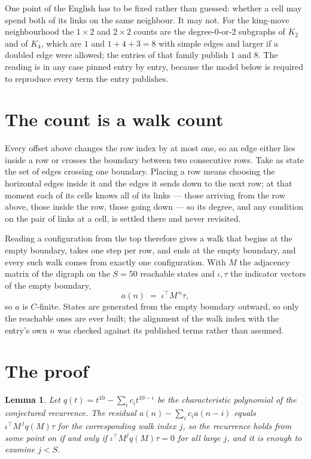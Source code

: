 \documentclass[11pt,a4paper]{article}
\theoremstyle{plain}
\newtheorem{lemma}[theorem]{Lemma}
\theoremstyle{definition}
\begin{document}
One point of the English has to be fixed rather than guessed: whether a cell may spend both of
its links on the same neighbour. It may not. For the king-move neighbourhood the $1\times2$
and $2\times2$ counts are the degree-$0$-or-$2$ subgraphs of $K_2$ and of $K_4$, which are $1$
and $1+4+3=8$ with simple edges and larger if a doubled edge were allowed; the entries of that
family publish $1$ and $8$. The reading is in any case pinned entry by entry, because the
model below is required to reproduce every term the entry publishes.


\section{The count is a walk count}

Every offset above changes the row index by at most one, so an edge either lies inside a row
or crosses the boundary between two consecutive rows. Take as state the set of edges crossing
one boundary. Placing a row means choosing the horizontal edges inside it and the edges it
sends down to the next row; at that moment each of its cells knows all of its links --- those
arriving from the row above, those inside the row, those going down --- so its degree, and any
condition on the pair of links at a cell, is settled there and never revisited.

Reading a configuration from the top therefore gives a walk that begins at the empty boundary,
takes one step per row, and ends at the empty boundary, and every such walk comes from exactly
one configuration. With $M$ the adjacency matrix of the digraph on the $S=50$ reachable
states and $\iota,\tau$ the indicator vectors of the empty boundary,
\[
a(n)\;=\;\iota^{\!\top}M^{\,n}\tau ,
\]
so $a$ is $C$-finite. States are generated from the empty boundary outward, so only the
reachable ones are ever built; the alignment of the walk index with the entry's own $n$ was
checked against its published terms rather than assumed.

\section{The proof}

\begin{lemma}\label{lem:crit}
Let $q(t)=t^{10}-\sum_i c_it^{10-i}$ be the characteristic polynomial of the
conjectured recurrence. The residual $a(n)-\sum_ic_ia(n-i)$ equals
$\iota^{\!\top}M^{\,j}q(M)\tau$ for the corresponding walk index $j$, so the recurrence
holds from some point on if and only if $\iota^{\!\top}M^{j}q(M)\tau=0$ for all large $j$,
and it is enough to examine $j<S$.
\end{lemma}
\end{document}
